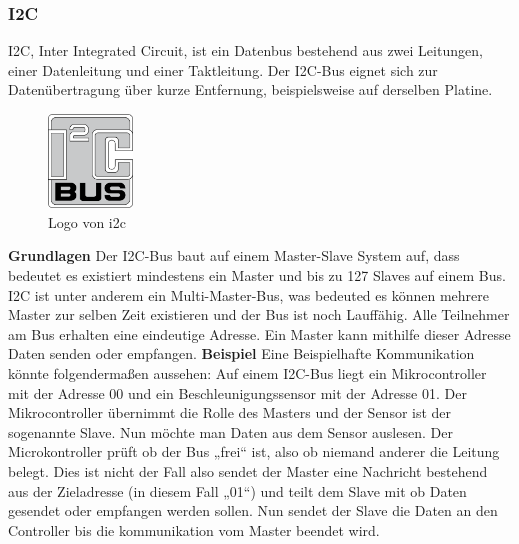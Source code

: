 \subsubsection{I2C}
\label{subsec:I2C}
I2C, Inter Integrated Circuit, ist ein Datenbus bestehend aus zwei Leitungen, einer Datenleitung und einer Taktleitung. Der I2C-Bus eignet sich zur Datenübertragung über kurze Entfernung, beispielsweise auf derselben Platine.

\begin{figure}
  \begin{center}
    \includegraphics[width=0.2\textwidth]{images/i2c}
  \end{center}
  \caption{Logo von i2c \cite{PERT.CH2-i2c.logo}}\label{Fig:imgi2cLogo}
\end{figure}

\textbf{Grundlagen\newline}
Der I2C-Bus baut auf einem Master-Slave System auf, dass bedeutet es existiert mindestens ein Master und bis zu 127 Slaves auf einem Bus. I2C ist unter anderem ein Multi-Master-Bus, was bedeuted es können mehrere Master zur selben Zeit existieren und der Bus ist noch Lauffähig.
Alle Teilnehmer am Bus erhalten eine eindeutige Adresse. Ein Master kann mithilfe dieser Adresse Daten senden oder empfangen.
\nextline
\textbf{Beispiel\nextline}
Eine Beispielhafte Kommunikation könnte folgendermaßen aussehen:
\nextline
Auf einem I2C-Bus liegt ein Mikrocontroller mit der Adresse 00 und ein Beschleunigungssensor mit der Adresse 01. Der Mikrocontroller übernimmt die Rolle des Masters und der Sensor ist der sogenannte Slave. Nun möchte man Daten aus dem Sensor auslesen. Der Microkontroller prüft ob der Bus „frei“ ist, also ob niemand anderer die Leitung belegt. Dies ist nicht der Fall also sendet der Master eine Nachricht bestehend aus der Zieladresse (in diesem Fall „01“) und teilt dem Slave mit ob Daten gesendet oder empfangen werden sollen. Nun sendet der Slave die Daten an den Controller bis die kommunikation vom Master beendet wird.


\clearpage %